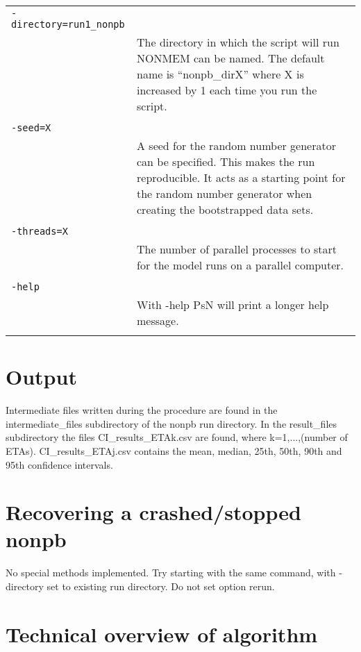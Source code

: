 \documentclass[a4paper,12pt]{article}
\begin{document}
\begin{longtable}{p{1in}p{4in}}
\verb|-directory=run1_nonpb| & \\
\nopagebreak
 & The directory in which the script will run NONMEM can be named. The default name is “nonpb\_dirX” where X is increased by 1 each time you run the script. \\
\\
\verb|-seed=X| & \\
\nopagebreak
 & A seed for the random number generator can be specified. This makes the run reproducible. It acts as a starting point for the random number generator when creating the bootstrapped data sets. \\
\\
\verb|-threads=X| & \\
\nopagebreak
 & The number of parallel processes to start for the model runs on a parallel computer. \\
\\
\verb|-help| & \\
\nopagebreak
 & With -help PsN will print a longer help message. \\
\\
\end{longtable}

\section{Output}
Intermediate files written during the procedure are found in the intermediate\_files subdirectory of the nonpb run directory. In the result\_files subdirectory the files CI\_results\_ETAk.csv are found, where k=1,...,(number of ETAs). CI\_results\_ETAj.csv contains the mean, median, 25th, 50th, 90th and 95th confidence intervals.

\section{Recovering a crashed/stopped nonpb}
No special methods implemented. Try starting with the same command, with -directory set to existing run directory. Do not set option rerun.

\section{Technical overview of algorithm}
\end{document}
